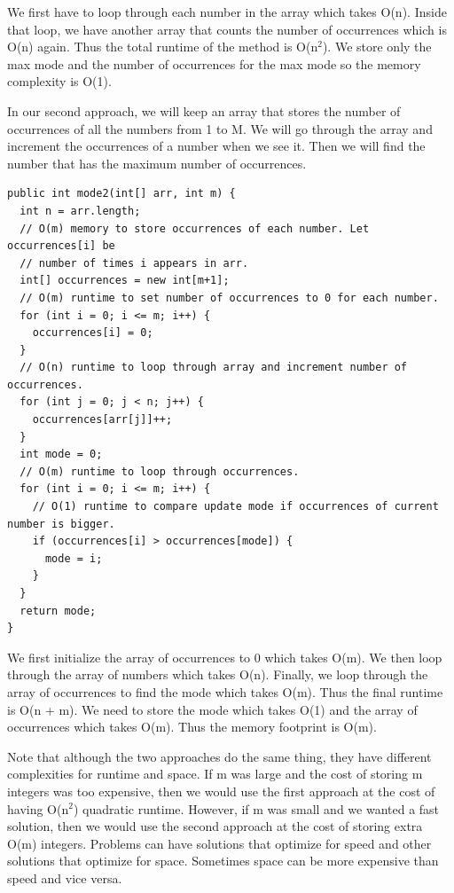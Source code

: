 \documentclass[11pt,oneside]{book}
\begin{document}
We first have to loop through each number in the array which takes O(n). Inside that loop, we have another array that counts the number of occurrences which is O(n) again. Thus the total runtime of the method is O(n$^{2}$). We store only the max mode and the number of occurrences for the max mode so the memory complexity is O(1).

In our second approach, we will keep an array that stores the number of occurrences of all the numbers from 1 to M. We will go through the array and increment the occurrences of a number when we see it. Then we will find the number that has the maximum number of occurrences.

\begin{lstlisting}
public int mode2(int[] arr, int m) {
  int n = arr.length;
  // O(m) memory to store occurrences of each number. Let occurrences[i] be 
  // number of times i appears in arr.
  int[] occurrences = new int[m+1];
  // O(m) runtime to set number of occurrences to 0 for each number.
  for (int i = 0; i <= m; i++) {
    occurrences[i] = 0;
  }
  // O(n) runtime to loop through array and increment number of occurrences.
  for (int j = 0; j < n; j++) {
    occurrences[arr[j]]++;
  }
  int mode = 0;
  // O(m) runtime to loop through occurrences.
  for (int i = 0; i <= m; i++) {
    // O(1) runtime to compare update mode if occurrences of current number is bigger.
    if (occurrences[i] > occurrences[mode]) {
      mode = i;
    }
  }
  return mode;
}
\end{lstlisting}

We first initialize the array of occurrences to 0 which takes O(m). We then loop through the array of numbers which takes O(n). Finally, we loop through the array of occurrences to find the mode which takes O(m). Thus the final runtime is O(n + m). We need to store the mode which takes O(1) and the array of occurrences which takes O(m). Thus the memory footprint is O(m).

Note that although the two approaches do the same thing, they have different complexities for runtime and space. If m was large and the cost of storing m integers was too expensive, then we would use the first approach at the cost of having O(n$^{2}$) quadratic runtime. However, if m was small and we wanted a fast solution, then we would use the second approach at the cost of storing extra O(m) integers. Problems can have solutions that optimize for speed and other solutions that optimize for space. Sometimes space can be more expensive than speed and vice versa.
\end{document}
